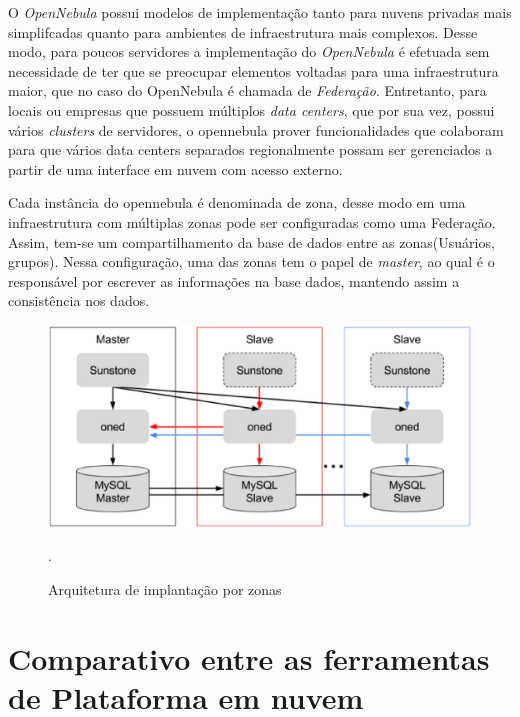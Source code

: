 O \textit{OpenNebula} possui modelos de implementação tanto para nuvens privadas mais simplifcadas quanto para ambientes de infraestrutura mais complexos. Desse modo, para poucos servidores a implementação do \textit{OpenNebula} é efetuada sem necessidade de ter que se preocupar elementos voltadas para uma infraestrutura maior, que no caso do OpenNebula é chamada de \textit{Federação}. Entretanto, para locais ou empresas que possuem múltiplos \textit{data centers}, que por sua vez, possui vários \textit{clusters} de servidores, o opennebula prover funcionalidades que colaboram para que vários data centers separados regionalmente possam ser gerenciados a partir de uma interface em nuvem com acesso externo. 

Cada instância do opennebula é denominada de zona, desse modo em uma infraestrutura com múltiplas zonas pode ser configuradas como uma Federação. Assim, tem-se um compartilhamento da base de dados entre as zonas(Usuários, grupos). Nessa configuração, uma das zonas tem o papel de \textit{master}, ao qual é o responsável por escrever as informações na base dados, mantendo assim a consistência nos dados\cite{opennebula}.

\begin{figure}[!htb]
\centering
\includegraphics [keepaspectratio=true,scale=0.50]{figuras/opennebula_zone.eps}
\caption{Arquitetura de implantação por zonas}
\cite{opennebula}.
\label{opennebulafederation}
\end{figure}

\section{Comparativo entre as ferramentas de Plataforma em nuvem}

